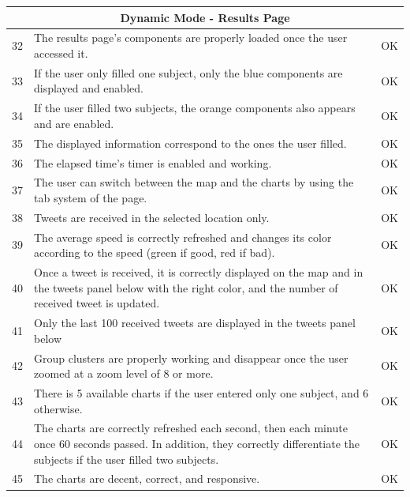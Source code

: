 \documentclass[a4paper,11pt]{report}
\begin{document}
\begin{center}
\begin{longtable}{|l|p{10cm}|p{4.4cm}|}
	\multicolumn{3}{|c|}{\textbf{Dynamic Mode - Results Page}}\\\hline	
	32 & The results page's components are properly loaded once the user accessed it. & \color{ForestGreen}OK\color{black}\\\hline
	33 & If the user only filled one subject, only the blue components are displayed and enabled. & \color{ForestGreen}OK\color{black}\\\hline
	34 & If the user filled two subjects, the orange components also appears and are enabled. & \color{ForestGreen}OK\color{black}\\\hline
	35 & The displayed information correspond to the ones the user filled. & \color{ForestGreen}OK\color{black}\\\hline
	36 & The elapsed time's timer is enabled and working. & \color{ForestGreen}OK\color{black}\\\hline
	37 & The user can switch between the map and the charts by using the tab system of the page. & \color{ForestGreen}OK\color{black}\\\hline 
	38 & Tweets are received in the selected location only. & \color{ForestGreen}OK\color{black}\\\hline
	39 & The average speed is correctly refreshed and changes its color according to the speed (green if good, red if bad). & \color{ForestGreen}OK\color{black}\\\hline
	40 & Once a tweet is received, it is correctly displayed on the map and in the tweets panel below with the right color, and the number of received tweet is updated. & \color{ForestGreen}OK\color{black}\\\hline
	41 & Only the last 100 received tweets are displayed in the tweets panel below & \color{ForestGreen}OK\color{black}\\\hline
	42 & Group clusters are properly working and disappear once the user zoomed at a zoom level of 8 or more. & \color{ForestGreen}OK\color{black}\\\hline
	43 & There is 5 available charts if the user entered only one subject, and 6 otherwise. & \color{ForestGreen}OK\color{black}\\\hline
	44 & The charts are correctly refreshed each second, then each minute once 60 seconds passed. In addition, they correctly differentiate the subjects if the user filled two subjects. & \color{ForestGreen}OK\color{black}\\\hline
	45 & The charts are decent, correct, and responsive. & \color{ForestGreen}OK\color{black}\\\hline

\end{longtable}
\end{center}
\end{document}
